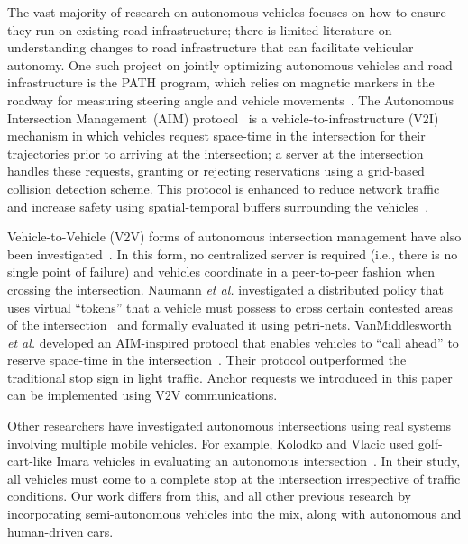The vast majority of research on autonomous vehicles focuses on how to
ensure they run on existing road infrastructure; there is limited
literature on understanding changes to road infrastructure that can
facilitate vehicular autonomy.  One such project on jointly optimizing
autonomous vehicles and road infrastructure is the PATH program, which
relies on magnetic markers in the roadway for measuring steering angle
and vehicle movements~\cite{bib:Shladover91Automated}.  The Autonomous
Intersection Management~(AIM) protocol~\cite{JAIR08-dresner, trr11,
Quinlan10MixReality} is a vehicle-to-infrastructure (V2I) mechanism in
which vehicles request space-time in the intersection for their
trajectories prior to arriving at the intersection; a server at the
intersection handles these requests, granting or rejecting
reservations using a grid-based collision detection scheme. This
protocol is enhanced to reduce network traffic and increase safety
using spatial-temporal buffers surrounding the vehicles~\cite{trr11}.

Vehicle-to-Vehicle (V2V) forms of autonomous intersection management
have also been investigated~\cite{naumann97:intersection,
ATT08-vanmiddlesworth}.  In this form, no centralized server is
required (i.e., there is no single point of failure) and vehicles
coordinate in a peer-to-peer fashion when crossing the
intersection. Naumann {\em et al.} investigated a distributed policy
that uses virtual ``tokens'' that a vehicle must possess to cross
certain contested areas of the
intersection~\cite{naumann97:intersection} and formally evaluated it
using petri-nets.  VanMiddlesworth {\em et al.} developed an
AIM-inspired protocol that enables vehicles to ``call ahead'' to
reserve space-time in the
intersection~\cite{ATT08-vanmiddlesworth}. Their protocol outperformed
the traditional stop sign in light traffic. Anchor requests we
introduced in this paper can be implemented using V2V communications.


Other researchers have investigated autonomous intersections using
real systems involving multiple mobile vehicles.  For example, Kolodko
and Vlacic used golf-cart-like Imara vehicles in evaluating an
autonomous intersection~\cite{Kolodko03:INRIA}.  In their study, all
vehicles must come to a complete stop at the intersection irrespective
of traffic conditions.  Our work differs from this, and all other
previous research by incorporating semi-autonomous vehicles into the
mix, along with autonomous and human-driven cars.



